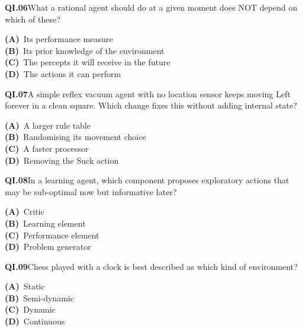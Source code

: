 \documentclass[11pt]{article}
\begin{document}
\begin{tcolorbox}[enhanced,breakable,colback=white,colframe=navyL,arc=2mm,boxrule=0.7pt,left=3mm,right=3mm,top=2mm,bottom=2mm]
\textbf{\color{navy}QI.06}\quad What a rational agent should do at a given moment does NOT depend on which of these?\hfill{}\par\smallskip
{\small \textbf{\color{navyL}(A)}\ Its performance measure\\[1pt]\textbf{\color{navyL}(B)}\ Its prior knowledge of the environment\\[1pt]\textbf{\color{navyL}(C)}\ The percepts it will receive in the future\\[1pt]\textbf{\color{navyL}(D)}\ The actions it can perform}
\end{tcolorbox}
\begin{tcolorbox}[enhanced,breakable,colback=white,colframe=navyL,arc=2mm,boxrule=0.7pt,left=3mm,right=3mm,top=2mm,bottom=2mm]
\textbf{\color{navy}QI.07}\quad A simple reflex vacuum agent with no location sensor keeps moving Left forever in a clean square. Which change fixes this without adding internal state?\hfill{}\par\smallskip
{\small \textbf{\color{navyL}(A)}\ A larger rule table\\[1pt]\textbf{\color{navyL}(B)}\ Randomising its movement choice\\[1pt]\textbf{\color{navyL}(C)}\ A faster processor\\[1pt]\textbf{\color{navyL}(D)}\ Removing the Suck action}
\end{tcolorbox}
\begin{tcolorbox}[enhanced,breakable,colback=white,colframe=navyL,arc=2mm,boxrule=0.7pt,left=3mm,right=3mm,top=2mm,bottom=2mm]
\textbf{\color{navy}QI.08}\quad In a learning agent, which component proposes exploratory actions that may be sub-optimal now but informative later?\hfill{}\par\smallskip
{\small \textbf{\color{navyL}(A)}\ Critic\\[1pt]\textbf{\color{navyL}(B)}\ Learning element\\[1pt]\textbf{\color{navyL}(C)}\ Performance element\\[1pt]\textbf{\color{navyL}(D)}\ Problem generator}
\end{tcolorbox}
\begin{tcolorbox}[enhanced,breakable,colback=white,colframe=navyL,arc=2mm,boxrule=0.7pt,left=3mm,right=3mm,top=2mm,bottom=2mm]
\textbf{\color{navy}QI.09}\quad Chess played with a clock is best described as which kind of environment?\hfill{}\par\smallskip
{\small \textbf{\color{navyL}(A)}\ Static\\[1pt]\textbf{\color{navyL}(B)}\ Semi-dynamic\\[1pt]\textbf{\color{navyL}(C)}\ Dynamic\\[1pt]\textbf{\color{navyL}(D)}\ Continuous}
\end{tcolorbox}
\end{document}

